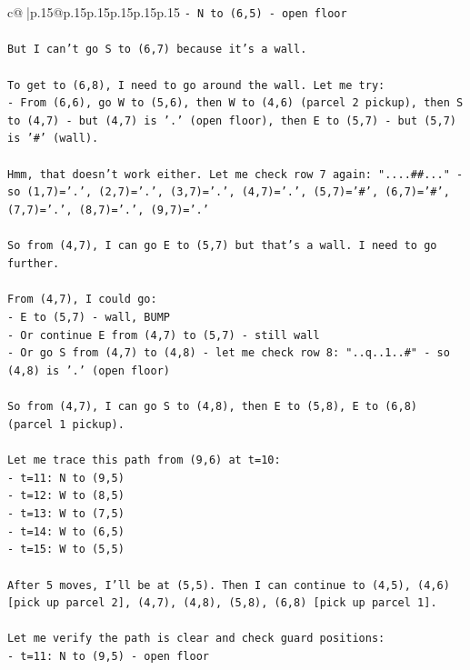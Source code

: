 \documentclass{article}
\begin{document}
{\begin{supertabular}{c@{$\;$}|p{.15\linewidth}@{}p{.15\linewidth}p{.15\linewidth}p{.15\linewidth}p{.15\linewidth}p{.15\linewidth}}
{{{\texttt{{-} N to (6,5) {-} open floor} \\
\\ 
\texttt{But I can't go S to (6,7) because it's a wall.} \\
\\ 
\texttt{To get to (6,8), I need to go around the wall. Let me try:} \\
\texttt{{-} From (6,6), go W to (5,6), then W to (4,6) (parcel 2 pickup), then S to (4,7) {-} but (4,7) is '.' (open floor), then E to (5,7) {-} but (5,7) is '\#' (wall).} \\
\\ 
\texttt{Hmm, that doesn't work either. Let me check row 7 again: "....\#\#..." {-} so (1,7)='.', (2,7)='.', (3,7)='.', (4,7)='.', (5,7)='\#', (6,7)='\#', (7,7)='.', (8,7)='.', (9,7)='.'} \\
\\ 
\texttt{So from (4,7), I can go E to (5,7) but that's a wall. I need to go further.} \\
\\ 
\texttt{From (4,7), I could go:} \\
\texttt{{-} E to (5,7) {-} wall, BUMP} \\
\texttt{{-} Or continue E from (4,7) to (5,7) {-} still wall} \\
\texttt{{-} Or go S from (4,7) to (4,8) {-} let me check row 8: "..q..1..\#" {-} so (4,8) is '.' (open floor)} \\
\\ 
\texttt{So from (4,7), I can go S to (4,8), then E to (5,8), E to (6,8) (parcel 1 pickup).} \\
\\ 
\texttt{Let me trace this path from (9,6) at t=10:} \\
\texttt{{-} t=11: N to (9,5)} \\
\texttt{{-} t=12: W to (8,5)} \\
\texttt{{-} t=13: W to (7,5)} \\
\texttt{{-} t=14: W to (6,5)} \\
\texttt{{-} t=15: W to (5,5)} \\
\\ 
\texttt{After 5 moves, I'll be at (5,5). Then I can continue to (4,5), (4,6) {[}pick up parcel 2{]}, (4,7), (4,8), (5,8), (6,8) {[}pick up parcel 1{]}.} \\
\\ 
\texttt{Let me verify the path is clear and check guard positions:} \\
\texttt{{-} t=11: N to (9,5) {-} open floor} \\
}}}
\end{supertabular}}
\end{document}
